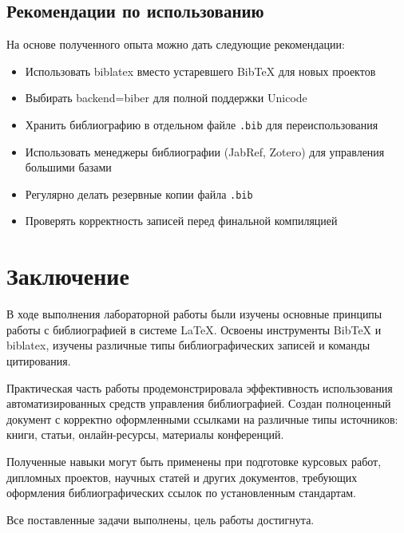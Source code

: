 \documentclass[12pt, a4paper]{article}
\begin{document}
\subsection{Рекомендации по использованию}

На основе полученного опыта можно дать следующие рекомендации:

\begin{itemize}
  \item Использовать biblatex вместо устаревшего BibTeX для новых проектов
  \item Выбирать backend=biber для полной поддержки Unicode
  \item Хранить библиографию в отдельном файле \texttt{.bib} для переиспользования
  \item Использовать менеджеры библиографии (JabRef, Zotero) для управления большими базами
  \item Регулярно делать резервные копии файла \texttt{.bib}
  \item Проверять корректность записей перед финальной компиляцией
\end{itemize}

\section{Заключение}

В ходе выполнения лабораторной работы были изучены основные принципы работы с библиографией в системе LaTeX. Освоены инструменты BibTeX и biblatex, изучены различные типы библиографических записей и команды цитирования.

Практическая часть работы продемонстрировала эффективность использования автоматизированных средств управления библиографией. Создан полноценный документ с корректно оформленными ссылками на различные типы источников: книги, статьи, онлайн-ресурсы, материалы конференций.

Полученные навыки могут быть применены при подготовке курсовых работ, дипломных проектов, научных статей и других документов, требующих оформления библиографических ссылок по установленным стандартам.

Все поставленные задачи выполнены, цель работы достигнута.

\newpage
\printbibliography[title={Список использованных источников}]
\end{document}
